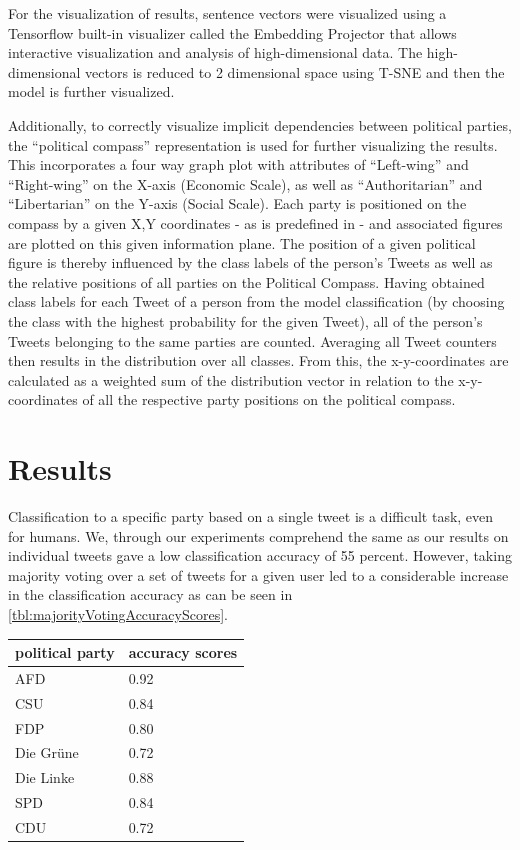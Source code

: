 \documentclass[10pt, oneside]{article}
\begin{document}
\begin{multicols}{2}
For the visualization of results, sentence vectors were visualized using a Tensorflow built-in visualizer called the Embedding Projector that allows interactive visualization and analysis of high-dimensional data.
The high-dimensional vectors is reduced to 2 dimensional space using T-SNE and then the model is further visualized.

Additionally, to correctly visualize implicit dependencies between political parties, the ``political compass'' \cite{PoliticalCompass2017} representation is used for further visualizing the results. This incorporates a four way graph plot with attributes of ``Left-wing'' and ``Right-wing'' on the X-axis (Economic Scale), as well as ``Authoritarian'' and ``Libertarian'' on the Y-axis (Social Scale). Each party is positioned on the compass by a given X,Y coordinates - as is predefined in \cite{PoliticalCompass2017} - and associated figures are plotted on this given information plane.
The position of a given political figure is thereby influenced by the class labels of the person's Tweets as well as the relative positions of all parties on the Political Compass. Having obtained class labels for each Tweet of a person from the model classification (by choosing the class with the highest probability for the given Tweet), all of the person's Tweets belonging to the same parties are counted. Averaging all Tweet counters then results in the distribution over all classes. From this, the x-y-coordinates are calculated as a weighted sum of the distribution vector in relation to the x-y-coordinates of all the respective party positions on the political compass.


\section{Results}

Classification to a specific party based on a single tweet is a difficult task, even for humans. We, through our experiments comprehend the same as our results on individual tweets gave a low classification accuracy of 55 percent.
However, taking majority voting over a set of tweets for a given user led to a considerable increase in the classification accuracy as can be seen in \autoref{tbl:majorityVotingAccuracyScores}.

\begin{center}
	\begin{tabular}{|l|l|}
	\hline
	\textbf{political party} & \textbf{accuracy scores} \\ \hline
	AFD & 0.92 \\
	CSU & 0.84 \\
	FDP & 0.80 \\
	Die Grüne & 0.72 \\
	Die Linke & 0.88 \\
	SPD & 0.84 \\
	CDU & 0.72 \\
	\hline
	\end{tabular}
	\label{tbl:majorityVotingAccuracyScores}
\end{center}


\end{multicols}
\end{document}
